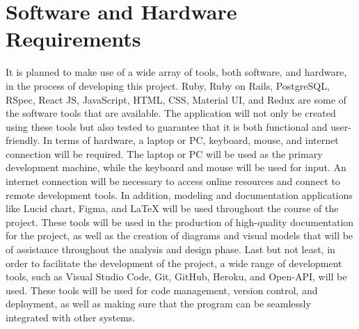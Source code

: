 \section{Software and Hardware Requirements}
\begin{justify}
It is planned to make use of a wide array of tools, both software, and hardware, in the process of developing this project. Ruby, Ruby on Rails, PostgreSQL, RSpec, React JS, JavaScript, HTML, CSS, Material UI, and Redux are some of the software tools that are available. The application will not only be created using these tools but also tested to guarantee that it is both functional and user-friendly.
\vspace{0.25cm}
\newendline In terms of hardware, a laptop or PC, keyboard, mouse, and internet connection will be required. The laptop or PC will be used as the primary development machine, while the keyboard and mouse will be used for input. An internet connection will be necessary to access online resources and connect to remote development tools.
\vspace{0.25cm}
\newendline In addition, modeling and documentation applications like Lucid chart, Figma, and LaTeX will be used throughout the course of the project. These tools will be used in the production of high-quality documentation for the project, as well as the creation of diagrams and visual models that will be of assistance throughout the analysis and design phase. Last but not least, in order to facilitate the development of the project, a wide range of development tools, such as Visual Studio Code, Git, GitHub, Heroku, and Open-API, will be used. These tools will be used for code management, version control, and deployment, as well as making sure that the program can be seamlessly integrated with other systems.
\end{justify}



\clearpage